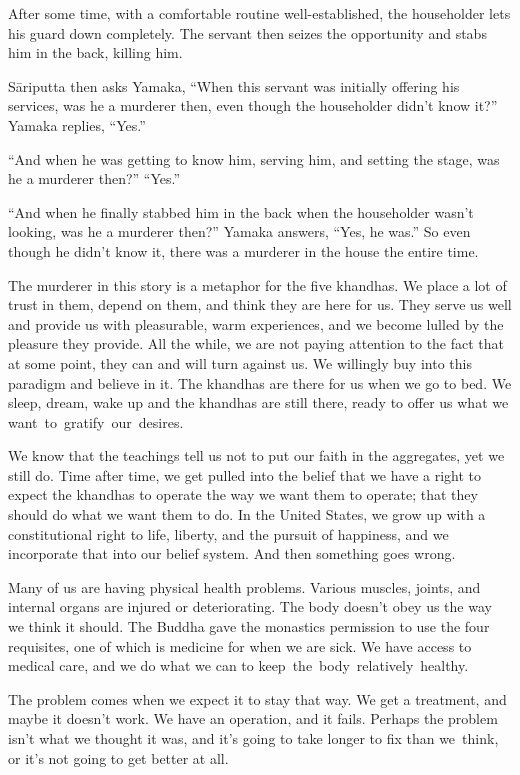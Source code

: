 After some time, with a comfortable routine well-established, the householder lets his guard down completely. The servant then seizes the opportunity and stabs him in the back, killing him.

\enlargethispage{1\baselineskip}
Sāriputta then asks Yamaka, ``When this servant was initially offering his services, was he a murderer then, even though the householder didn't know it?'' Yamaka replies, ``Yes.''

``And when he was getting to know him, serving him, and setting the stage, was he a murderer then?'' ``Yes.''

``And when he finally stabbed him in the back when the householder wasn't looking, was he a murderer then?'' Yamaka answers, ``Yes, he was.'' So even though he didn't know it, there was a murderer in the house the entire time.

The murderer in this story is a metaphor for the five khandhas. We place a lot of trust in them, depend on them, and think they are here for us. They serve us well and provide us with pleasurable, warm experiences, and we become lulled by the pleasure they provide. All the while, we are not paying attention to the fact that at some point, they can and will turn against us. We willingly buy into this paradigm and believe in it. The khandhas are there for us when we go to bed. We sleep, dream, wake up and the khandhas are still there, ready to offer us what we \mbox{want to gratify our desires.}

We know that the teachings tell us not to put our faith in the aggregates, yet we still do. Time after time, we get pulled into the belief that we have a right to expect the khandhas to operate the way we want them to operate; that they should do what we want them to do. In the United States, we grow up with a constitutional right to life, liberty, and the pursuit of happiness, and we incorporate that into our belief system. And then something goes wrong.

Many of us are having physical health problems. Various muscles, joints, and internal organs are injured or deteriorating. The body doesn't obey us the way we think it should. The Buddha gave the monastics permission to use the four requisites, one of which is medicine for when we are sick. We have access to medical care, and we do what we can to \mbox{keep the body relatively healthy.}

The problem comes when we expect it to stay that way. We get a treatment, and maybe it doesn't work. We have an operation, and it fails. Perhaps the problem isn't what we thought it was, and it's going to take longer to fix than \mbox{we think}, or it's not going to get better at all.

